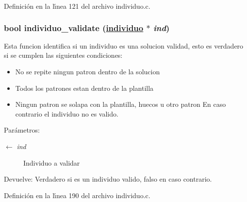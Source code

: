 Definici\'{o}n en la l\'{\i}nea 121 del archivo individuo.c.\hypertarget{group__genetic_gf80cc38ea4d590f6c45215f770d63778_gf80cc38ea4d590f6c45215f770d63778}{
\subsubsection[individuo\_\-validate]{\setlength{\rightskip}{0pt plus 5cm}bool individuo\_\-validate (\hyperlink{struct__individuo}{individuo} $\ast$ {\em ind})}}
\label{group__genetic_gf80cc38ea4d590f6c45215f770d63778_gf80cc38ea4d590f6c45215f770d63778}


Esta funcion identifica si un individuo es una solucion validad, esto es verdadero si se cumplen las siguientes condiciones:\begin{itemize}
\item No se repite ningun patron dentro de la solucion\item Todos los patrones estan dentro de la plantilla\item Ningun patron se solapa con la plantilla, huecos u otro patron En caso contrario el individuo no es valido.\end{itemize}


\begin{Desc}
\item[Par\'{a}metros:]
\begin{description}
\item[\mbox{$\leftarrow$} {\em ind}]Individuo a validar \end{description}
\end{Desc}
\begin{Desc}
\item[Devuelve:]Verdadero si es un individuo valido, falso en caso contrario. \end{Desc}


Definici\'{o}n en la l\'{\i}nea 190 del archivo individuo.c.

